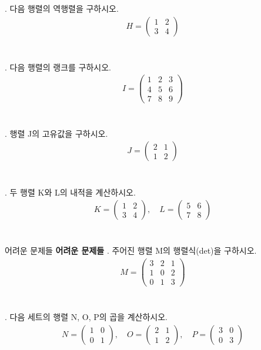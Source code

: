 \documentclass[fleqn]{article}
\begin{document}
. 다음 행렬의 역행렬을 구하시오.
\begin{align*}
H = \begin{pmatrix}
1 & 2 \\
3 & 4
\end{pmatrix}
\end{align*}
\\\\

. 다음 행렬의 랭크를 구하시오.
\begin{align*}
I = \begin{pmatrix}
1 & 2 & 3 \\
4 & 5 & 6 \\
7 & 8 & 9
\end{pmatrix}
\end{align*}
\\\\

. 행렬 J의 고유값을 구하시오.
\begin{align*}
J = \begin{pmatrix}
2 & 1 \\
1 & 2
\end{pmatrix}
\end{align*}
\\\\

. 두 행렬 K와 L의 내적을 계산하시오.
\begin{align*}
K = \begin{pmatrix}
1 & 2 \\
3 & 4
\end{pmatrix}, \quad L = \begin{pmatrix}
5 & 6 \\
7 & 8
\end{pmatrix}
\end{align*}
\\\\

 어려운 문제들
\textbf{어려운 문제들}
. 주어진 행렬 M의 행렬식(det)을 구하시오.
\begin{align*}
M = \begin{pmatrix}
3 & 2 & 1 \\
1 & 0 & 2 \\
0 & 1 & 3
\end{pmatrix}
\end{align*}
\\\\

. 다음 세트의 행렬 N, O, P의 곱을 계산하시오.
\begin{align*}
N = \begin{pmatrix}
1 & 0 \\
0 & 1
\end{pmatrix}, \quad O = \begin{pmatrix}
2 & 1 \\
1 & 2
\end{pmatrix}, \quad P = \begin{pmatrix}
3 & 0 \\
0 & 3
\end{pmatrix}
\end{align*}
\\\\
\end{document}
